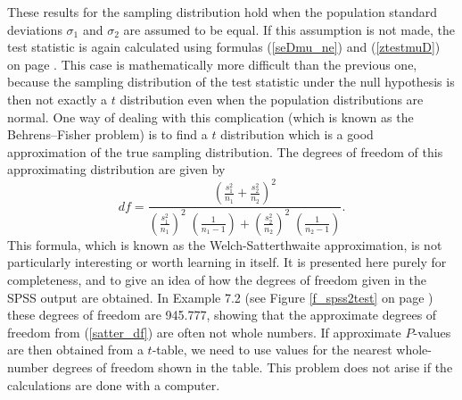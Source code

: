 These results for the sampling distribution hold when the
population standard deviations $\sigma_{1}$ and $\sigma_{2}$ are assumed
to be equal. If this assumption is not made, the test statistic is again
calculated using formulas (\ref{seDmu_ne}) and (\ref{ztestmuD}) on
page \pageref{ztestmuD}. This case is mathematically more difficult than
the previous one, because
the sampling distribution of the test statistic under the null
hypothesis is then not exactly a $t$ distribution even when the
population distributions are normal. One way of dealing with this
complication (which is known as the Behrens--Fisher problem) is
to find a $t$ distribution which is a good approximation of the true
sampling distribution. The degrees of freedom of this approximating
distribution are given by
\begin{equation}
df=\frac{\left(
\frac{s^{2}_{1}}{n_{1}}+
\frac{s^{2}_{2}}{n_{2}}
\right)^{2}}
{
\left(\frac{s_{1}^{2}}{n_{1}}\right)^{2}\;
\left(\frac{1}{n_{1}-1}\right)
+
\left(\frac{s_{2}^{2}}{n_{2}}\right)^{2}\;
\left(\frac{1}{n_{2}-1}\right)
}.
\label{satter_df}
\end{equation}
This formula, which is known as the Welch-Satterthwaite approximation,
is not particularly interesting or worth learning in itself. It is
presented here purely for completeness, and to give an idea of how the
degrees of freedom given in the SPSS output are obtained. In Example 7.2
(see Figure \ref{f_spss2test} on page \pageref{f_spss2test}) these
degrees of freedom are 945.777, showing that the approximate degrees of
freedom from (\ref{satter_df}) are often not whole numbers. If
approximate $P$-values are then obtained from a $t$-table, we need to
use values for the nearest whole-number degrees of freedom shown in the
table. This problem does not arise if the calculations are done with a
computer.

